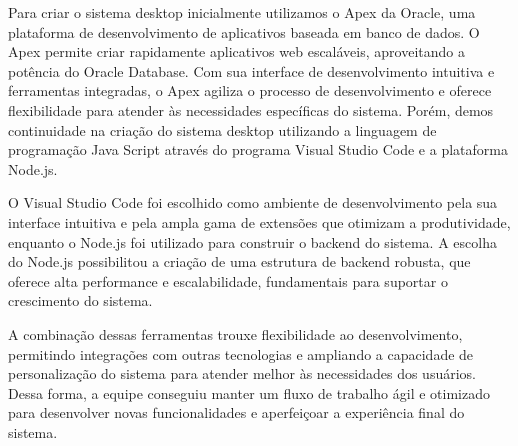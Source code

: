 Para criar o sistema desktop inicialmente utilizamos o Apex da Oracle, uma plataforma de desenvolvimento de aplicativos baseada em banco de dados. O Apex permite criar rapidamente aplicativos web escaláveis, aproveitando a potência do Oracle Database. Com sua interface de desenvolvimento intuitiva e ferramentas integradas, o Apex agiliza o processo de desenvolvimento e oferece flexibilidade para atender às necessidades específicas do sistema. Porém, demos continuidade na criação do sistema desktop utilizando a linguagem de programação Java Script através do programa Visual Studio Code e a plataforma Node.js.

O Visual Studio Code foi escolhido como ambiente de desenvolvimento pela sua interface intuitiva e pela ampla gama de extensões que otimizam a produtividade, enquanto o Node.js foi utilizado para construir o backend do sistema. A escolha do Node.js possibilitou a criação de uma estrutura de backend robusta, que oferece alta performance e escalabilidade, fundamentais para suportar o crescimento do sistema.

A combinação dessas ferramentas trouxe flexibilidade ao desenvolvimento, permitindo integrações com outras tecnologias e ampliando a capacidade de personalização do sistema para atender melhor às necessidades dos usuários. Dessa forma, a equipe conseguiu manter um fluxo de trabalho ágil e otimizado para desenvolver novas funcionalidades e aperfeiçoar a experiência final do sistema.